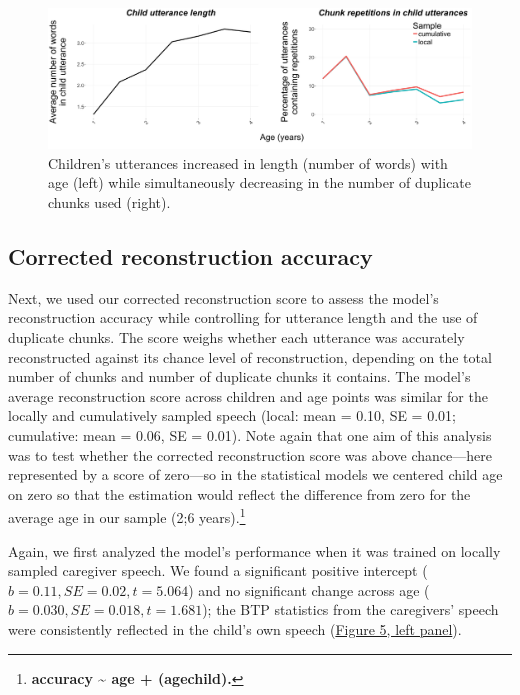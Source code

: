 \documentclass[man,mask,floatsintext]{apa6}
\let\rmarkdownfootnote\footnote%
\def\footnote{\protect\rmarkdownfootnote}
\begin{document}
\begin{figure}

{\centering \includegraphics[width=0.95\linewidth]{images/plotbothfactors} 

}

\caption{Children's utterances increased in length (number of words) with age (left) while simultaneously decreasing in the number of duplicate chunks used (right).}\label{fig:fig4}
\end{figure}

\subsection{Corrected reconstruction
accuracy}\label{corrected-reconstruction-accuracy-1}

Next, we used our corrected reconstruction score to assess the model's
reconstruction accuracy while controlling for utterance length and the
use of duplicate chunks. The score weighs whether each utterance was
accurately reconstructed against its chance level of reconstruction,
depending on the total number of chunks and number of duplicate chunks
it contains. The model's average reconstruction score across children
and age points was similar for the locally and cumulatively sampled
speech (local: mean = 0.10, SE = 0.01; cumulative: mean = 0.06, SE =
0.01). Note again that one aim of this analysis was to test whether the
corrected reconstruction score was above chance---here represented by a
score of zero---so in the statistical models we centered child age on
zero so that the estimation would reflect the difference from zero for
the average age in our sample (2;6 years).\footnote{\textbf{accuracy
  \textasciitilde{} age + (age\textbar{}child).}}

Again, we first analyzed the model's performance when it was trained on
locally sampled caregiver speech. We found a significant positive
intercept (\(b = 0.11, SE = 0.02, t = 5.064\)) and no significant change
across age (\(b = 0.030, SE = 0.018, t = 1.681\)); the BTP statistics
from the caregivers' speech were consistently reflected in the child's
own speech (\protect\hyperlink{fig5}{Figure 5, left panel}).
\end{document}
